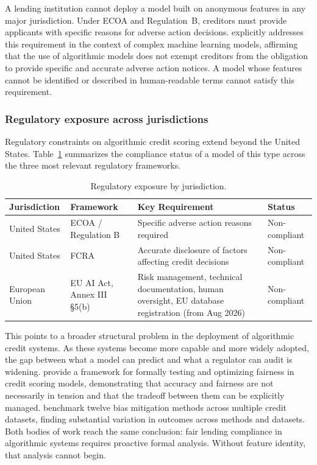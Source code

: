 \documentclass[11pt]{article}
\newcommand{\rowhead}{\rowcolor{NavyReport!15}}
\newcommand{\rowalt}{\rowcolor{LightGray}}
\begin{document}
A lending institution cannot deploy a model built on anonymous features in any major jurisdiction. Under ECOA and Regulation~B, creditors must provide applicants with specific reasons for adverse action decisions. \citet{cfpb2022} explicitly addresses this requirement in the context of complex machine learning models, affirming that the use of algorithmic models does not exempt creditors from the obligation to provide specific and accurate adverse action notices. A model whose features cannot be identified or described in human-readable terms cannot satisfy this requirement.

\subsubsection*{Regulatory exposure across jurisdictions}

Regulatory constraints on algorithmic credit scoring extend beyond the United States. Table~\ref{tab:regulatory} summarizes the compliance status of a model of this type across the three most relevant regulatory frameworks.

\begin{table}[H]
\centering
\caption{Regulatory exposure by jurisdiction.}
\label{tab:regulatory}
\setlength{\arrayrulewidth}{0.4pt}
\begin{tabularx}{\textwidth}{llXl}
\toprule
\rowhead
\color{white}\textbf{Jurisdiction} &
\color{white}\textbf{Framework} &
\color{white}\textbf{Key Requirement} &
\color{white}\textbf{Status} \\
\midrule
United States & ECOA / Regulation B & Specific adverse action reasons required & Non-compliant \\
\rowalt
United States & FCRA & Accurate disclosure of factors affecting credit decisions & Non-compliant \\
European Union & EU AI Act, Annex III \S5(b) & Risk management, technical documentation, human oversight, EU database registration (from Aug 2026) & Non-compliant \\
\bottomrule
\end{tabularx}
\end{table}

This points to a broader structural problem in the deployment of algorithmic credit systems. As these systems become more capable and more widely adopted, the gap between what a model can predict and what a regulator can audit is widening. \citet{kozodoi2022} provide a framework for formally testing and optimizing fairness in credit scoring models, demonstrating that accuracy and fairness are not necessarily in tension and that the tradeoff between them can be explicitly managed. \citet{dumitrescu2022} benchmark twelve bias mitigation methods across multiple credit datasets, finding substantial variation in outcomes across methods and datasets. Both bodies of work reach the same conclusion: fair lending compliance in algorithmic systems requires proactive formal analysis. Without feature identity, that analysis cannot begin.
\end{document}
